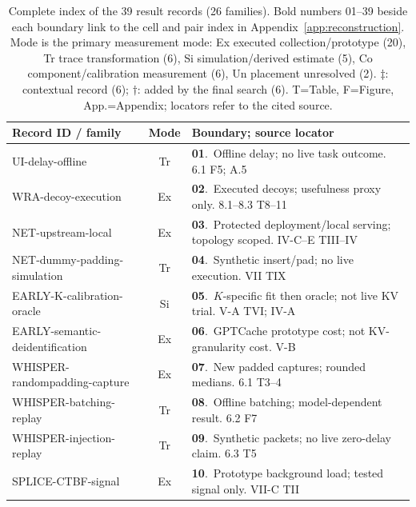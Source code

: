 \begin{table}[p]\centering\scriptsize
\caption{Complete index of the 39 result records (26 families). Bold numbers 01--39 beside each boundary link to the cell and pair index in Appendix~\ref{app:reconstruction}. Mode is the primary measurement mode: Ex executed collection/prototype (20), Tr trace transformation (6), Si simulation/derived estimate (5), Co component/calibration measurement (6), Un placement unresolved (2). $\ddagger$: contextual record (6); $\dagger$: added by the final search (6). T=Table, F=Figure, App.=Appendix; locators refer to the cited source.}\label{tab:r9-record-index}
\setlength{\tabcolsep}{2pt}
\begin{minipage}[t]{0.495\textwidth}\vspace{0pt}
\begin{tabularx}{\linewidth}{@{}p{.36\linewidth}cY@{}}\toprule
Record ID / family & Mode & Boundary; source locator\\\midrule
\textsf{UI-delay-offline}~\cite{uitraces2026} & Tr & \textbf{01}.~Offline delay; no live task outcome. 6.1 F5; A.5\\
\textsf{WRA-decoy-execution}~\cite{jeong2026wra} & Ex & \textbf{02}.~Executed decoys; usefulness proxy only. 8.1--8.3 T8--11\\
\textsf{NET-upstream-local}~\cite{netecho2025} & Ex & \textbf{03}.~Protected deployment/local serving; topology scoped. IV-C--E TIII--IV\\
\textsf{NET-dummy-padding-simulation}~\cite{netecho2025} & Tr & \textbf{04}.~Synthetic insert/pad; no live execution. VII TIX\\
\textsf{EARLY-K-calibration-oracle}~\cite{earlybird2025} & Si & \textbf{05}.~$K$-specific fit then oracle; not live KV trial. V-A TVI; IV-A\\
\textsf{EARLY-semantic-deidentification}~\cite{earlybird2025} & Ex & \textbf{06}.~GPTCache prototype cost; not KV-granularity cost. V-B\\
\textsf{WHISPER-randompadding-capture}~\cite{whisperleak2025} & Ex & \textbf{07}.~New padded captures; rounded medians. 6.1 T3--4\\
\textsf{WHISPER-batching-replay}~\cite{whisperleak2025} & Tr & \textbf{08}.~Offline batching; model-dependent result. 6.2 F7\\
\textsf{WHISPER-injection-replay}~\cite{whisperleak2025} & Tr & \textbf{09}.~Synthetic packets; no live zero-delay claim. 6.3 T5\\
\textsf{SPLICE-CTBF-signal}~\cite{spliceleak2026} & Ex & \textbf{10}.~Prototype background load; tested signal only. VII-C TII\\

\end{tabularx}
\end{minipage}
\end{table}
